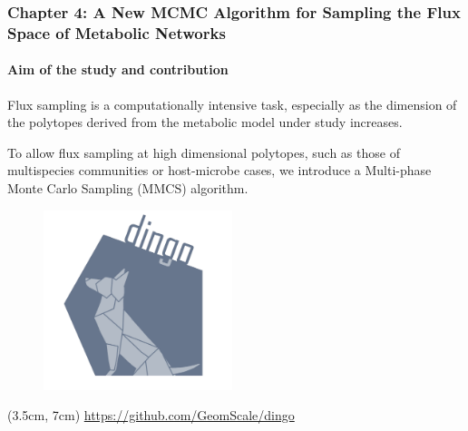 \documentclass{beamer}
\begin{document}
    \begin{darkframes}
      \begin{frame}
         \frametitle{\textbf{Chapter 4}: A New MCMC Algorithm for Sampling
         the Flux Space of Metabolic Networks}
         \framesubtitle{Aim of the study and contribution}

         \small
         Flux sampling is a computationally intensive task, especially as the dimension of the 
         polytopes derived from the metabolic model under study increases. 



         \bigskip
         To allow flux sampling at high dimensional polytopes, 
         such as those of multispecies communities or host-microbe cases,
         we introduce a Multi-phase Monte Carlo Sampling (MMCS) algorithm. 


      \end{frame}
   \end{darkframes}

   \begin{frame}
      
      \begin{figure}
         \includegraphics[width=55mm]{../met_nets/resources/dingo5_transparent.png}
      \end{figure}

      \begin{textblock*}{12cm}(3.5cm, 7cm)
         \href{https://github.com/GeomScale/dingo}{https://github.com/GeomScale/dingo}
      \end{textblock*}
   \end{frame}
   \fi 
\end{document}
